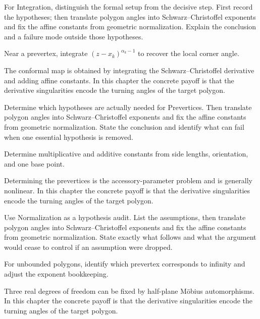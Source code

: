 \begin{exercise}\label{exr:iv18-04}
For Integration, distinguish the formal setup from the decisive step. First record the hypotheses; then translate polygon angles into Schwarz--Christoffel exponents and fix the affine constants from geometric normalization. Explain the conclusion and a failure mode outside those hypotheses.
\end{exercise}
\begin{hint}
Near a prevertex, integrate \((z-x_k)^{\alpha_k-1}\) to recover the local corner angle.
\end{hint}
\begin{solution}
The conformal map is obtained by integrating the Schwarz–Christoffel derivative and adding affine constants. In this chapter the concrete payoff is that the derivative singularities encode the turning angles of the target polygon.
\end{solution}

\begin{exercise}\label{exr:iv18-05}
Determine which hypotheses are actually needed for Prevertices. Then translate polygon angles into Schwarz--Christoffel exponents and fix the affine constants from geometric normalization. State the conclusion and identify what can fail when one essential hypothesis is removed.
\end{exercise}
\begin{hint}
Determine multiplicative and additive constants from side lengths, orientation, and one base point.
\end{hint}
\begin{solution}
Determining the prevertices is the accessory-parameter problem and is generally nonlinear. In this chapter the concrete payoff is that the derivative singularities encode the turning angles of the target polygon.
\end{solution}

\begin{exercise}\label{exr:iv18-06}
Use Normalization as a hypothesis audit. List the assumptions, then translate polygon angles into Schwarz--Christoffel exponents and fix the affine constants from geometric normalization. State exactly what follows and what the argument would cease to control if an assumption were dropped.
\end{exercise}
\begin{hint}
For unbounded polygons, identify which prevertex corresponds to infinity and adjust the exponent bookkeeping.
\end{hint}
\begin{solution}
Three real degrees of freedom can be fixed by half-plane Möbius automorphisms. In this chapter the concrete payoff is that the derivative singularities encode the turning angles of the target polygon.
\end{solution}

